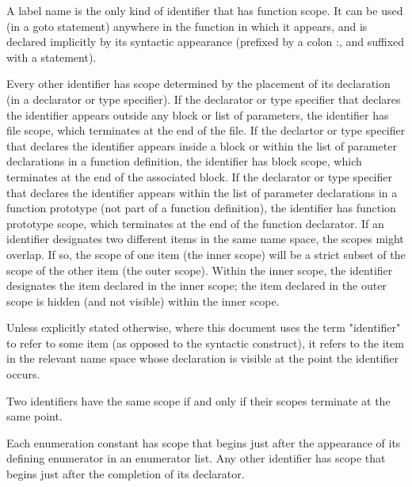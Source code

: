 \documentclass{article}
\begin{document}
A label name is the only kind of identifier that has function scope.  It can be used (in 
a goto statement) anywhere in the function in which it appears, and is declared
implicitly by its syntactic appearance (prefixed by a colon :, and suffixed with a 
statement).
\linebreak

Every other identifier has scope determined by the placement of its declaration (in a 
declarator or type specifier).  If the declarator or type specifier that declares the 
identifier appears outside any block or list of parameters, the identifier has file 
scope,  which terminates at the end of the file.  If the declartor or type specifier that
declares the identifier appears inside a block or within the list of parameter
declarations in a  function definition, the identifier has block scope, which terminates
at the end of the  associated block.  If the declarator or type specifier that declares 
the identifier appears  within the list of parameter declarations in a function prototype
(not part of a function definition), the identifier has function prototype scope, which 
terminates at the end of the function declarator.  If an identifier designates two 
different items in the same  name space, the scopes might overlap.  If so, the scope of 
one item (the inner scope) will be a strict subset of the scope of the other item (the 
outer scope). Within the inner scope, the identifier designates the item declared in the
inner scope; the item declared in the  outer scope is hidden (and not visible) within 
the inner scope.
\linebreak

Unless explicitly stated otherwise, where this document uses the term "identifier" to 
refer to some item (as opposed to the syntactic construct), it refers to the item in the 
relevant name space whose declaration is visible at the point the identifier occurs.
\linebreak

Two identifiers have the same scope if and only if their scopes terminate at the same 
point.
\linebreak

Each enumeration constant has scope that begins just after the appearance of its defining
enumerator in an enumerator list. Any other identifier has scope that begins just after 
the completion of its declarator.

\end{document}
